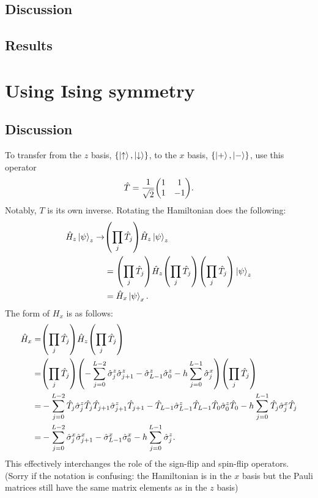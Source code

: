 \documentclass{article}
\begin{document}
\subsection{
Discussion
}

\subsection{
Results
}

\newpage

\section{
Using Ising symmetry
}

\subsection{
Discussion
}

To transfer from the $z$ basis, $\{\ket{\uparrow}, \ket{\downarrow} \}$,
to the $x$ basis, $\{\ket{+}, \ket{-}\}$, use this operator
\begin{align}
    \hat T = \frac{1}{\sqrt{2}} \mqty( 1 & 1 \\ 1 & -1 ).
\end{align}
Notably, $T$ is its own inverse. 
Rotating the Hamiltonian does the following:
\begin{align}
    \hat H_z \ket{\psi}_z
        \to& \qty( \prod_j \hat T_j ) \hat H_z \ket{\psi}_z
    \\
    &= \qty( \prod_j \hat T_j ) \hat H_z \qty( \prod_j \hat T_j )
        \qty( \prod_j \hat T_j ) \ket{\psi}_z 
    \\
    &= \hat H_x \ket{\psi}_x.
\end{align}
The form of $H_x$ is as follows:
\begin{align}
    \hat H_x =& \qty( \prod_j \hat T_j ) \hat H_z \qty( \prod_j \hat T_j )
    \\
    =& \qty( \prod_j \hat T_j )
        \qty( -\sum_{j=0}^{L-2} \hat \sigma^z_{j} \hat \sigma^z_{j+1} 
            - \hat \sigma^z_{L-1} \hat \sigma^z_{0}
            -h \sum_{j=0}^{L-1} \hat \sigma^x_{j})
        \qty( \prod_j \hat T_j )
    \\
    =& -\sum_{j=0}^{L-2} \hat T_j \hat \sigma^z_{j} \hat T_j
                        \hat T_{j+1} \hat \sigma^z_{j+1} \hat T_{j+1}
        - \hat T_{L-1} \hat \sigma^z_{L-1} \hat T_{L-1} 
             \hat T_{0}  \hat \sigma^z_{0} \hat T_{0} 
        -h \sum_{j=0}^{L-1}  \hat T_{j} \hat \sigma^x_{j} \hat T_{j}
    \\
    =& -\sum_{j=0}^{L-2} \hat \sigma^x_{j} \hat \sigma^x_{j+1}
        - \hat \sigma^x_{L-1} \hat \sigma^x_{0} 
        -h \sum_{j=0}^{L-1}  \hat \sigma^z_{j}.
\end{align}
This effectively interchanges the role of the sign-flip and spin-flip operators.
(Sorry if the notation is confusing: the Hamiltonian is in the $x$ basis but
the Pauli matrices still have the same matrix elements as in the $z$ basis)
\end{document}
